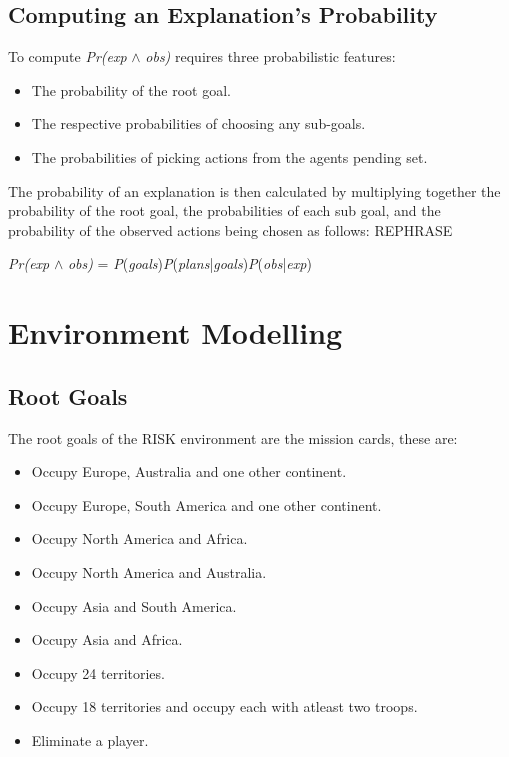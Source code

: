 \documentclass[parskip]{cs4rep}
\begin{document}
\subsection{Computing an Explanation's Probability}

To compute \textit{Pr(exp} $\wedge$ \textit{obs)} requires three probabilistic features:\newline

\begin{itemize}
\item
The probability of the root goal.
\item
The respective probabilities of choosing any sub-goals.
\item
The probabilities of picking actions from the agents pending set.\newline
\end{itemize}

The probability of an explanation is then calculated by multiplying together the probability of the root goal, the probabilities of each sub goal, and the probability of the observed actions being chosen as follows: REPHRASE\newline

\centerline{
\textit{Pr(exp} $\wedge$ \textit{obs)} = \textit{P}(\textit{goals})\textit{P}(\textit{plans}|\textit{goals})\textit{P}(\textit{obs}|\textit{exp})
}

\section{Environment Modelling}

\subsection{Root Goals}

The root goals of the RISK environment are the mission cards, these are:

\begin{itemize}
\item
Occupy Europe, Australia and one other continent.
\item
Occupy Europe, South America and one other continent.
\item
Occupy North America and Africa.
\item
Occupy North America and Australia.
\item
Occupy Asia and South America.
\item
Occupy Asia and Africa.
\item
Occupy 24 territories.
\item
Occupy 18 territories and occupy each with atleast two troops.
\item
Eliminate a player.
\newline
\end{itemize}
\end{document}
